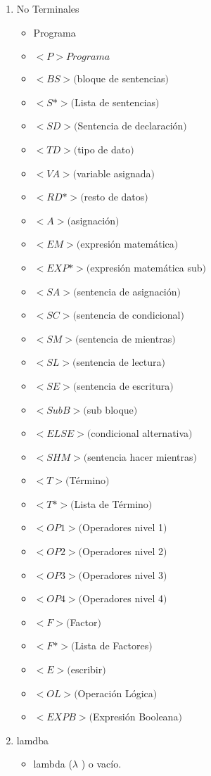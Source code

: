 \documentclass{article}
\begin{document}
\begin{enumerate}
		\item No Terminales
	\begin{itemize}
			\item Programa
\item $<P>Programa$
\item $<BS>($bloque de sentencias$)$
\item $ <S*>($Lista de sentencias$) $
\item $ <SD> ($Sentencia de declaración$)  $
\item $ <TD>($tipo de dato$) $
\item $ <VA>($variable asignada$) $
\item $<RD*>($resto de datos$)$
\item $<A>($asignación$)$
\item $<EM>($expresión matemática$)$
\item $<EXP*>($expresión matemática sub$)$
\item $<SA>($sentencia de asignación$)$
\item $<SC>($sentencia de condicional$)$
\item $<SM>($sentencia de mientras$)$
\item $<SL>($sentencia de lectura$)$
\item $<SE>($sentencia de escritura$)$
\item $<SubB>($sub bloque$)$
\item $<ELSE>($condicional alternativa$)$
\item $<SHM>($sentencia hacer mientras$)$
\item $<T>($Término$)$
\item $<T*>($Lista de Término$)$
\item $<OP1>($Operadores nivel 1$)$
\item $<OP2>($Operadores nivel 2$)$
\item $<OP3>($Operadores nivel 3$)$
\item $<OP4>($Operadores nivel 4$)$
\item $<F>($Factor$)$
\item $<F*>($Lista de Factores$)$
\item $<E>($escribir$)$
\item $<OL>($Operación Lógica$)$
\item $<EXPB>($Expresión Booleana$)$
	\end{itemize}
\item lamdba 
\begin{itemize}
\item lambda ($ \lambda $ ) o vacío.
\end{itemize}	
	
\end{enumerate}
\end{document}
